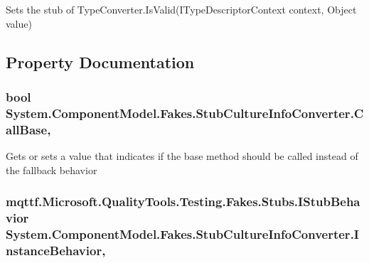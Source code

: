 Sets the stub of Type\-Converter.\-Is\-Valid(\-I\-Type\-Descriptor\-Context context, Object value)



\subsection{Property Documentation}
\hypertarget{class_system_1_1_component_model_1_1_fakes_1_1_stub_culture_info_converter_ae0abc49088ce673b27dffe18240d97a8}{
\subsubsection[{Call\-Base}]{\setlength{\rightskip}{0pt plus 5cm}bool System.\-Component\-Model.\-Fakes.\-Stub\-Culture\-Info\-Converter.\-Call\-Base\hspace{0.3cm}{\ttfamily [get]}, {\ttfamily [set]}}}\label{class_system_1_1_component_model_1_1_fakes_1_1_stub_culture_info_converter_ae0abc49088ce673b27dffe18240d97a8}


Gets or sets a value that indicates if the base method should be called instead of the fallback behavior

\hypertarget{class_system_1_1_component_model_1_1_fakes_1_1_stub_culture_info_converter_a95aeb4d08fb742ddf31fadae3b303f90}{
\subsubsection[{Instance\-Behavior}]{\setlength{\rightskip}{0pt plus 5cm}mqttf.\-Microsoft.\-Quality\-Tools.\-Testing.\-Fakes.\-Stubs.\-I\-Stub\-Behavior System.\-Component\-Model.\-Fakes.\-Stub\-Culture\-Info\-Converter.\-Instance\-Behavior\hspace{0.3cm}{\ttfamily [get]}, {\ttfamily [set]}}}\label{class_system_1_1_component_model_1_1_fakes_1_1_stub_culture_info_converter_a95aeb4d08fb742ddf31fadae3b303f90}


